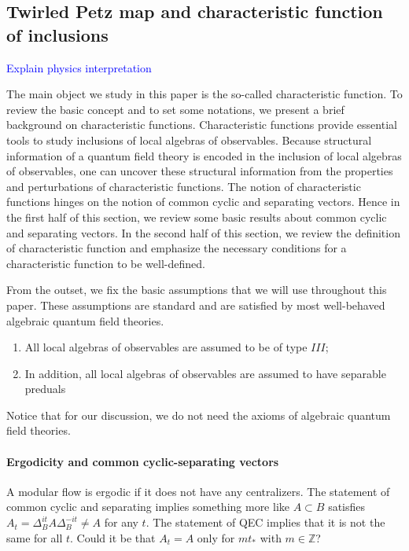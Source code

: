 \documentclass[a4paper,11pt]{article}
\theoremstyle{definition}
\newcommand{\NL}[1]{\textcolor{blue}{#1}}
\begin{document}
\subsection*{Twirled Petz map and characteristic function of inclusions}


\NL{Explain physics interpretation}

The main object we study in this paper is the so-called characteristic function\cite{revolutionizing}. To review the basic concept and to set some notations, we present a brief background on characteristic functions. Characteristic functions provide essential tools to study inclusions of local algebras of observables. Because structural information of a quantum field theory is encoded in the inclusion of local algebras of observables\cite{haag2012local}, one can uncover these structural information from the properties and perturbations of characteristic functions. The notion of characteristic functions hinges on the notion of common cyclic and separating vectors. Hence in the first half of this section, we review some basic results about common cyclic and separating vectors. In the second half of this section, we review the definition of characteristic function and emphasize the necessary conditions for a characteristic function to be well-defined.

From the outset, we fix the basic assumptions that we will use throughout this paper. These assumptions are standard and are satisfied by most well-behaved algebraic quantum field theories.
\begin{enumerate}
    \item All local algebras of observables are assumed to be of type $III$;
    \item In addition, all local algebras of observables are assumed to have separable preduals
\end{enumerate}
Notice that for our discussion, we do not need the axioms of algebraic quantum field theories.


\paragraph{Ergodicity and common cyclic-separating vectors}\label{subsection:common}

A modular flow is ergodic if it does not have any centralizers. The statement of common cyclic and separating implies something more like $A\subset B$ satisfies $A_t=\Delta_B^{it} A \Delta_B^{-it} \neq A$ for any $t$. The statement of QEC implies that it is not the same for all $t$. Could it be that $A_t=A$ only for $m t_*$ with $m\in \mathbb{Z}$?
\end{document}
